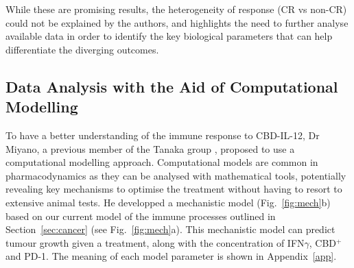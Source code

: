 \documentclass[11pt]{article}
\begin{document}
While these are promising results, the heterogeneity of response (CR vs non-CR) could not be explained by the authors, and highlights the need to further analyse available data in order to identify the key biological parameters that can help differentiate the diverging outcomes.

\subsection{Data Analysis with the Aid of Computational Modelling}\label{ssec:prevWork}

To have a better understanding of the immune response to CBD-IL-12, Dr Miyano, a previous member of the Tanaka group \cite{takuya}, proposed to use a computational modelling approach. Computational models are common in pharmacodynamics as they can be analysed with mathematical tools, potentially revealing key mechanisms to optimise the treatment without having to resort to extensive animal tests. He developped a mechanistic model (Fig.~\ref{fig:mech}b) based on our current model of the immune processes outlined in Section~\ref{sec:cancer} (see Fig.~\ref{fig:mech}a). This mechanistic model can predict tumour growth given a treatment, along with the concentration of IFN$\gamma$, CBD$^+$ and PD-1. The meaning of each model parameter is shown in Appendix~\ref{app}. 
\end{document}
